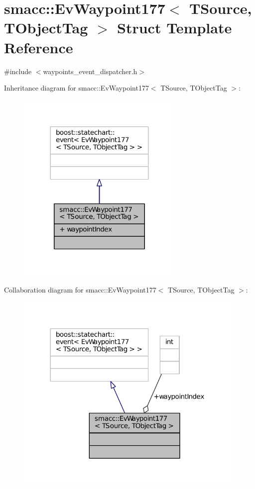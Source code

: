 \hypertarget{structsmacc_1_1EvWaypoint177}{}\section{smacc\+:\+:Ev\+Waypoint177$<$ T\+Source, T\+Object\+Tag $>$ Struct Template Reference}
\label{structsmacc_1_1EvWaypoint177}


{\ttfamily \#include $<$waypoints\+\_\+event\+\_\+dispatcher.\+h$>$}



Inheritance diagram for smacc\+:\+:Ev\+Waypoint177$<$ T\+Source, T\+Object\+Tag $>$\+:
\nopagebreak
\begin{figure}[H]
\begin{center}
\leavevmode
\includegraphics[width=227pt]{structsmacc_1_1EvWaypoint177__inherit__graph}
\end{center}
\end{figure}


Collaboration diagram for smacc\+:\+:Ev\+Waypoint177$<$ T\+Source, T\+Object\+Tag $>$\+:
\nopagebreak
\begin{figure}[H]
\begin{center}
\leavevmode
\includegraphics[width=312pt]{structsmacc_1_1EvWaypoint177__coll__graph}
\end{center}
\end{figure}
